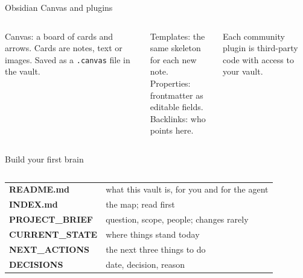 \begin{frame}{Obsidian Canvas and plugins}
  \begin{columns}[T,onlytextwidth]
      {\small Canvas: a board of cards and arrows. Cards are notes, text or images. Saved as a \texttt{.canvas} file in the vault.\par}
      \vspace{0.4em}
      {\small Templates: the same skeleton for each new note.\\[0.25em]
      Properties: frontmatter as editable fields.\\[0.25em]
      Backlinks: who points here.\par}
      \vspace{0.35em}
      {\scriptsize\color{muted} Each community plugin is third-party code with access to your vault.\par}
  \end{columns}
\end{frame}

\begin{frame}{Build your first brain}
  \begin{columns}[T,onlytextwidth]
      \renewcommand{\arraystretch}{1.18}
      {\small
      \begin{tabularx}{\linewidth}{>{\ttfamily\bfseries\color{ink}}l >{\leavevmode\color{dark}}X}
      README.md & what this vault is, for you and for the agent\\
      INDEX.md & the map; read first\\
      PROJECT\_BRIEF & question, scope, people; changes rarely\\
      CURRENT\_STATE & where things stand today\\
      NEXT\_ACTIONS & the next three things to do\\
      DECISIONS & date, decision, reason\\
      \end{tabularx}}
  \end{columns}
\end{frame}

